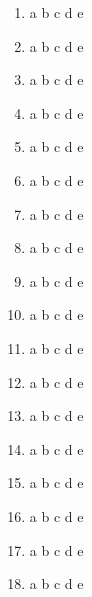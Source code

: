 \documentclass[8pt]{article}
\begin{document}
\begin{multicols*}{2}
\begin{enumerate}
\item \large \textcircled{\small{a}} \textcircled{\small{b}} \textcircled{\small{c}} \textcircled{\small{d}} \textcircled{\small{e}}
\item \large \textcircled{\small{a}} \textcircled{\small{b}} \textcircled{\small{c}} \textcircled{\small{d}} \textcircled{\small{e}}
\item \large \textcircled{\small{a}} \textcircled{\small{b}} \textcircled{\small{c}} \textcircled{\small{d}} \textcircled{\small{e}}
\item \large \textcircled{\small{a}} \textcircled{\small{b}} \textcircled{\small{c}} \textcircled{\small{d}} \textcircled{\small{e}}
\item \large \textcircled{\small{a}} \textcircled{\small{b}} \textcircled{\small{c}} \textcircled{\small{d}} \textcircled{\small{e}}
\item \large \textcircled{\small{a}} \textcircled{\small{b}} \textcircled{\small{c}} \textcircled{\small{d}} \textcircled{\small{e}}
\item \large \textcircled{\small{a}} \textcircled{\small{b}} \textcircled{\small{c}} \textcircled{\small{d}} \textcircled{\small{e}}
\item \large \textcircled{\small{a}} \textcircled{\small{b}} \textcircled{\small{c}} \textcircled{\small{d}} \textcircled{\small{e}}
\item \large \textcircled{\small{a}} \textcircled{\small{b}} \textcircled{\small{c}} \textcircled{\small{d}} \textcircled{\small{e}}
\item \large \textcircled{\small{a}} \textcircled{\small{b}} \textcircled{\small{c}} \textcircled{\small{d}} \textcircled{\small{e}}
\item \large \textcircled{\small{a}} \textcircled{\small{b}} \textcircled{\small{c}} \textcircled{\small{d}} \textcircled{\small{e}}
\item \large \textcircled{\small{a}} \textcircled{\small{b}} \textcircled{\small{c}} \textcircled{\small{d}} \textcircled{\small{e}}
\item \large \textcircled{\small{a}} \textcircled{\small{b}} \textcircled{\small{c}} \textcircled{\small{d}} \textcircled{\small{e}}
\item \large \textcircled{\small{a}} \textcircled{\small{b}} \textcircled{\small{c}} \textcircled{\small{d}} \textcircled{\small{e}}
\item \large \textcircled{\small{a}} \textcircled{\small{b}} \textcircled{\small{c}} \textcircled{\small{d}} \textcircled{\small{e}}
\item \large \textcircled{\small{a}} \textcircled{\small{b}} \textcircled{\small{c}} \textcircled{\small{d}} \textcircled{\small{e}}
\item \large \textcircled{\small{a}} \textcircled{\small{b}} \textcircled{\small{c}} \textcircled{\small{d}} \textcircled{\small{e}}
\item \large \textcircled{\small{a}} \textcircled{\small{b}} \textcircled{\small{c}} \textcircled{\small{d}} \textcircled{\small{e}}
\end{enumerate}
\end{multicols*}
 \setcounter{page}{0}
    \setcounter{page}{1}
\newpage  
 
\end{document}
